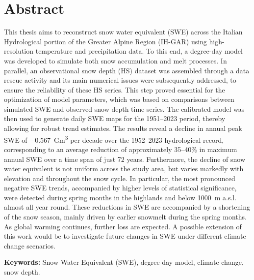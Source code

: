 \chapter*{Abstract}

\noindent
This thesis aims to reconstruct snow water equivalent (SWE) across the Italian Hydrological portion of the Greater Alpine Region 
(IH-GAR) using high-resolution temperature and precipitation data. To this end, a degree-day model was developed to simulate both 
snow accumulation and melt processes. In parallel, an observational snow depth (HS) dataset was assembled through a data 
rescue activity and its main numerical issues were subsequently addressed, to ensure the reliability of these HS series. This 
step proved essential for the optimization of model parameters, which was based on comparisons between simulated SWE and observed 
snow depth time series. The calibrated model was then used to generate daily SWE maps for the 1951--2023 period, thereby allowing 
for robust trend estimates. The results reveal a decline in annual peak SWE of \SI{-0.567}{\giga\meter\cubed} per decade over the 
1952--2023 hydrological record, corresponding to an average reduction of approximately 35--40\% in maximum annual SWE over a time 
span of just 72 years. Furthermore, the decline of snow water equivalent is not uniform across the study area, but varies markedly 
with elevation and throughout the snow cycle. In particular, the most pronounced negative SWE trends, accompanied by higher levels 
of statistical significance, were detected during spring months in the highlands and below \SI{1000}{\meter} a.s.l. almost all year 
round. These reductions in SWE are accompanied by a shortening of the snow season, mainly driven by earlier snowmelt during the 
spring months. As global warming continues, further loss are expected. A possible extension of this work would be to investigate 
future changes in SWE under different climate change scenarios. 

\bigskip
\noindent\textbf{Keywords:} Snow Water Equivalent (SWE), degree-day model, climate change, snow depth.


